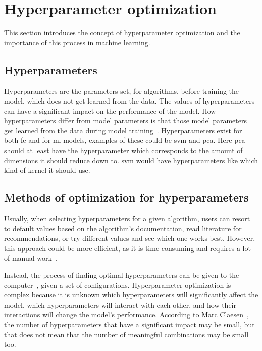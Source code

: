 \section{Hyperparameter optimization}\label{sec:hyperparam}
This section introduces the concept of hyperparameter optimization and the importance of this process in machine learning.


\subsection{Hyperparameters}\label{subsec:hyperparam-what}
Hyperparameters are the parameters set, for algorithms, before training the model, which does not get learned from the data. The values of hyperparameters can have a significant impact on the performance of the model. How hyperparameters differ from model parameters is that those model parameters get learned from the data during model training~\cite{probst2019tunability}. Hyperparameters exist for both \gls{fe} and for \gls{ml} models, examples of these could be \gls{svm} and \gls{pca}. Here \gls{pca} should at least have the hyperparameter which corresponds to the amount of dimensions it should reduce down to. \gls{svm} would have hyperparameters like which kind of kernel it should use.

\subsection{Methods of optimization for hyperparameters}\label{subsec:hyperparam-how}
Usually, when selecting hyperparameters for a given algorithm, users can resort to default values based on the algorithm's documentation, read literature for recommendations, or try different values and see which one works best. However, this approach could be more efficient, as it is time-consuming and requires a lot of manual work~\cite{probst2019tunability}.

Instead, the process of finding optimal hyperparameters can be given to the computer~\cite{automated-machine-learning}, given a set of configurations. Hyperparameter optimization is complex because it is unknown which hyperparameters will significantly affect the model, which hyperparameters will interact with each other, and how their interactions will change the model's performance. According to Marc Claesen~\cite{hyperparam-search}, the number of hyperparameters that have a significant impact may be small, but that does not mean that the number of meaningful combinations may be small too.

